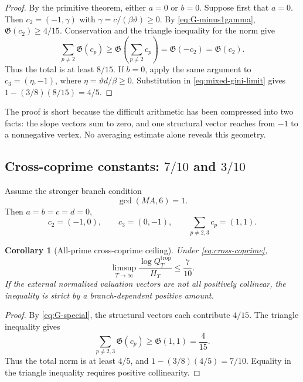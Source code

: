 \documentclass[11pt,oneside]{article}
\newtheorem{corollary}[theorem]{Corollary}
\theoremstyle{definition}
\theoremstyle{remark}
\begin{document}
\begin{proof}
By the primitive theorem, either $a=0$ or $b=0$.  Suppose first that $a=0$.  Then
$c_2=(-1,\gamma)$ with $\gamma=c/(\beta\vartheta)\ge0$.  By
\eqref{eq:G-minus1gamma}, $\mathfrak G(c_2)\ge4/15$.  Conservation and the triangle inequality
for the norm give
\[
  \sum_{p\ne2}\mathfrak G(c_p)
  \ge\mathfrak G\!\left(\sum_{p\ne2}c_p\right)
  =\mathfrak G(-c_2)
  =\mathfrak G(c_2).
\]
Thus the total is at least $8/15$.  If $b=0$, apply the same argument to
$c_3=(\eta,-1)$, where $\eta=\vartheta d/\beta\ge0$.  Substitution in
\eqref{eq:mixed-gini-limit} gives
$1-(3/8)(8/15)=4/5$.
\end{proof}

The proof is short because the difficult arithmetic has been compressed into two facts: the
slope vectors sum to zero, and one structural vector reaches from $-1$ to a nonnegative
vertex.  No averaging estimate alone reveals this geometry.

\subsection{Cross-coprime constants: \texorpdfstring{$7/10$ and $3/10$}{7/10 and 3/10}}

Assume the stronger branch condition
\begin{equation}\label{eq:cross-coprime}
  \gcd(MA,6)=1.
\end{equation}
Then $a=b=c=d=0$,
\[
  c_2=(-1,0),
  \qquad
  c_3=(0,-1),
  \qquad
  \sum_{p\ne2,3}c_p=(1,1).
\]

\begin{corollary}[All-prime cross-coprime ceiling]\label{cor:seven-tenths}
Under \eqref{eq:cross-coprime},
\begin{equation}\label{eq:seven-tenths}
 \limsup_{T\to\infty}
 \frac{\log Q_T^{\mathrm{trop}}}{H_T}
 \le\frac7{10}.
\end{equation}
If the external normalized valuation vectors are not all positively collinear, the inequality
is strict by a branch-dependent positive amount.
\end{corollary}

\begin{proof}
By \eqref{eq:G-special}, the structural vectors each contribute $4/15$.  The triangle
inequality gives
\[
  \sum_{p\ne2,3}\mathfrak G(c_p)
  \ge\mathfrak G(1,1)=\frac4{15}.
\]
Thus the total norm is at least $4/5$, and
$1-(3/8)(4/5)=7/10$.  Equality in the triangle inequality requires positive collinearity.
\end{proof}
\end{document}
